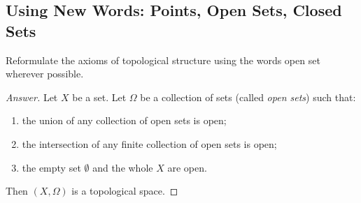 \subsection{Using New Words: Points, Open Sets, Closed Sets}
\begin{majorEx} %
  Reformulate the axioms of topological structure using the words open
  set wherever possible.
\end{majorEx}

\begin{proof}[Answer]
    Let $X$ be a set. Let $\Omega$ be a collection of sets (called
    \emph{open sets}) such that:
    \begin{enumerate}
        \item the union of any collection of open sets is open;
        \item the intersection of any finite collection of open sets is open;
        \item the empty set $\emptyset$ and the whole $X$ are open.
    \end{enumerate}
    Then $(X, \Omega)$ is a topological space.
\end{proof}

